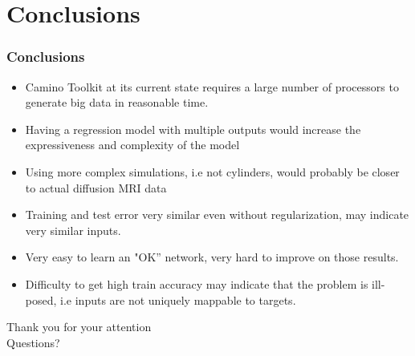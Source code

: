 \documentclass{beamer}
\begin{document}
\section{Conclusions}
\begin{frame}
\frametitle{Conclusions}
\begin{itemize}
\item<1->Camino Toolkit at its current state requires a large number of processors to generate big data in reasonable time.
\item<2->Having a regression model with multiple outputs would increase the expressiveness and complexity of the model
\item<3->Using more complex simulations, i.e not cylinders, would probably be closer to actual diffusion MRI data
\item<4->Training and test error very similar even without regularization, may indicate very similar inputs.
\item<5->Very easy to learn an "OK” network, very hard to improve on those results.
\item<6->Difficulty to get high train accuracy may indicate that the problem is ill-posed, i.e inputs are not uniquely mappable to targets.
\end{itemize}
\end{frame}

\begin{frame}
\begin{center}
\Huge Thank you for your attention\\
\Huge Questions?
\end{center}
\end{frame}
\end{document}
